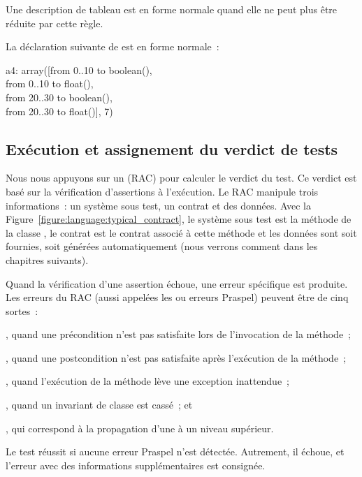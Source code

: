Une description de tableau est en forme normale quand elle ne peut plus être
réduite par cette règle.

\begin{example}

La déclaration suivante de  est en forme normale~:

\begin{pre}
a4: array([from  0..10 to boolean(), \\
           from  0..10 to float(), \\
           from 20..30 to boolean(), \\
           from 20..30 to float()], 7)
\end{pre}

\end{example}

\subsection{Exécution et assignement du verdict de tests}
\label{subsection:language:verdict}

Nous nous appuyons sur un  (RAC) pour
calculer le verdict du test. Ce verdict est basé sur la vérification
d'assertions à l'exécution. Le RAC manipule trois informations~: un système sous
test, un contrat et des données. Avec la
Figure~\ref{figure:language:typical_contract}, le système sous test est la
méthode  de la classe , le contrat est le contrat associé à
cette méthode et les données sont soit fournies, soit générées automatiquement
(nous verrons comment dans les chapitres suivants).

Quand la vérification d'une assertion échoue, une erreur spécifique est
produite. Les erreurs du RAC (aussi appelées les 
ou erreurs Praspel) peuvent être de cinq sortes~:
%
\begin{inparaenum}[$(i)$]
%
\item {}, quand une précondition n'est pas
satisfaite lors de l'invocation de la méthode~;
%
\item {}, quand une postcondition n'est pas
satisfaite après l'exécution de la méthode~;
%
\item {}, quand l'exécution de la méthode lève une
exception inattendue~;
%
\item {}, quand un invariant de classe est cassé~; et
%
\item {}, qui correspond à la propagation
d'une  à un niveau supérieur.
%
\end{inparaenum}

Le test réussit si aucune erreur Praspel n'est détectée. Autrement, il échoue,
et l'erreur avec des informations supplémentaires est consignée.
